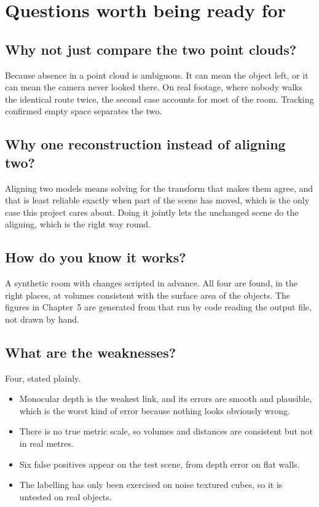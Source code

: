 \chapter{Questions worth being ready for}

\section{Why not just compare the two point clouds?}

Because absence in a point cloud is ambiguous. It can mean the object left, or it can mean the
camera never looked there. On real footage, where nobody walks the identical route twice, the
second case accounts for most of the room. Tracking confirmed empty space separates the two.

\section{Why one reconstruction instead of aligning two?}

Aligning two models means solving for the transform that makes them agree, and that is least
reliable exactly when part of the scene has moved, which is the only case this project cares
about. Doing it jointly lets the unchanged scene do the aligning, which is the right way round.

\section{How do you know it works?}

A synthetic room with changes scripted in advance. All four are found, in the right places, at
volumes consistent with the surface area of the objects. The figures in Chapter~5 are generated
from that run by code reading the output file, not drawn by hand.

\section{What are the weaknesses?}

Four, stated plainly.

\begin{itemize}
  \item Monocular depth is the weakest link, and its errors are smooth and plausible, which is the
        worst kind of error because nothing looks obviously wrong.
  \item There is no true metric scale, so volumes and distances are consistent but not in real
        metres.
  \item Six false positives appear on the test scene, from depth error on flat walls.
  \item The labelling has only been exercised on noise textured cubes, so it is untested on real
        objects.
\end{itemize}

